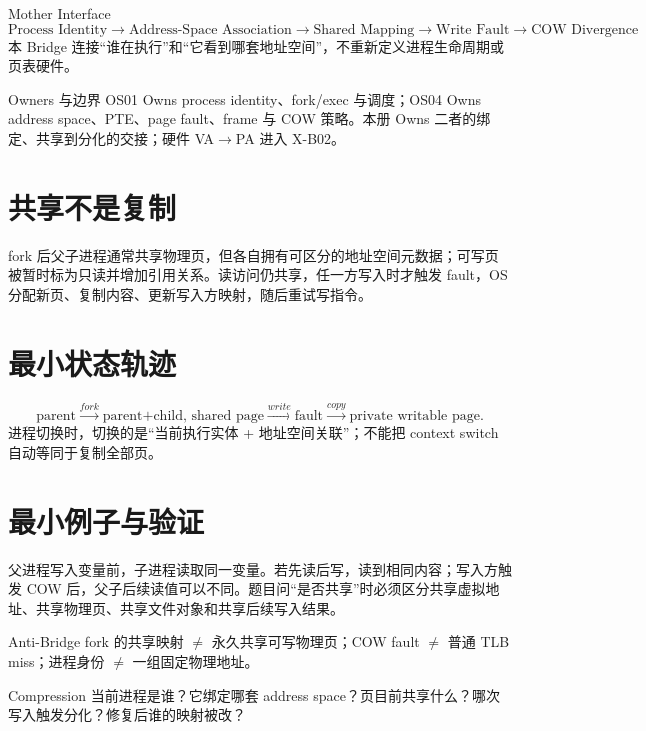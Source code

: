 \documentclass[UTF8,fontset=none,11pt,a4paper]{ctexart}
\begin{document}
\begin{corebox}{Mother Interface}
\[
\boxed{\text{Process Identity}\to\text{Address-Space Association}\to\text{Shared Mapping}\to\text{Write Fault}\to\text{COW Divergence}}
\]
本 Bridge 连接“谁在执行”和“它看到哪套地址空间”，不重新定义进程生命周期或页表硬件。
\end{corebox}
\begin{methodbox}{Owners 与边界}
OS01 Owns process identity、fork/exec 与调度；OS04 Owns address space、PTE、page fault、frame 与 COW 策略。本册 Owns 二者的绑定、共享到分化的交接；硬件 VA\(\to\)PA 进入 X-B02。
\end{methodbox}
\section{共享不是复制}
fork 后父子进程通常共享物理页，但各自拥有可区分的地址空间元数据；可写页被暂时标为只读并增加引用关系。读访问仍共享，任一方写入时才触发 fault，OS 分配新页、复制内容、更新写入方映射，随后重试写指令。
\section{最小状态轨迹}
\[
\text{parent}\xrightarrow{fork}\text{parent+child, shared page}\xrightarrow{write}\text{fault}\xrightarrow{copy}\text{private writable page}.
\]
进程切换时，切换的是“当前执行实体 + 地址空间关联”；不能把 context switch 自动等同于复制全部页。
\section{最小例子与验证}
父进程写入变量前，子进程读取同一变量。若先读后写，读到相同内容；写入方触发 COW 后，父子后续读值可以不同。题目问“是否共享”时必须区分共享虚拟地址、共享物理页、共享文件对象和共享后续写入结果。
\begin{warnbox}{Anti-Bridge}
fork 的共享映射 $\neq$ 永久共享可写物理页；COW fault $\neq$ 普通 TLB miss；进程身份 $\neq$ 一组固定物理地址。
\end{warnbox}
\begin{corebox}{Compression}
当前进程是谁？它绑定哪套 address space？页目前共享什么？哪次写入触发分化？修复后谁的映射被改？
\end{corebox}
\end{document}

